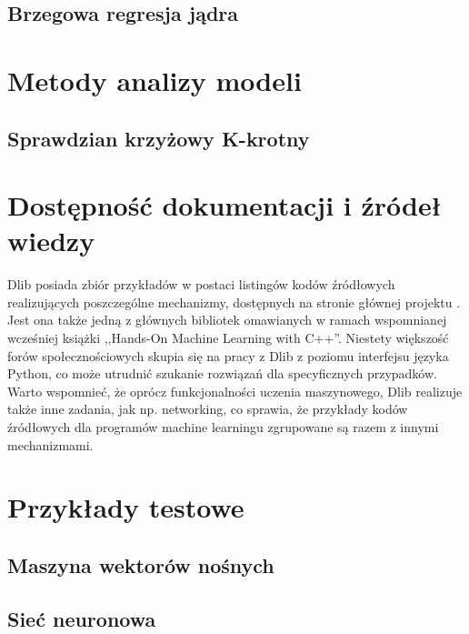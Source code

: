\subsection{Brzegowa regresja jądra}

\section{Metody analizy modeli}

\subsection{Sprawdzian krzyżowy K-krotny}

\section{Dostępność dokumentacji i źródeł wiedzy}

Dlib posiada zbiór przykładów w postaci listingów kodów źródłowych realizujących poszczególne mechanizmy, dostępnych na stronie głównej projektu \cite{dlib:home}. Jest ona także jedną z głównych bibliotek omawianych w ramach wspomnianej wcześniej książki ,,Hands-On Machine Learning with C++''. Niestety większość forów społecznościowych skupia się na pracy z Dlib z poziomu interfejsu języka Python, co może utrudnić szukanie rozwiązań dla specyficznych przypadków. Warto wspomnieć, że oprócz funkcjonalności uczenia maszynowego, Dlib realizuje także inne zadania, jak np. networking, co sprawia, że przykłady kodów źródłowych dla programów machine learningu zgrupowane są razem z innymi mechanizmami. 

\section{Przykłady testowe}

\subsection{Maszyna wektorów nośnych}
\subsection{Sieć neuronowa}